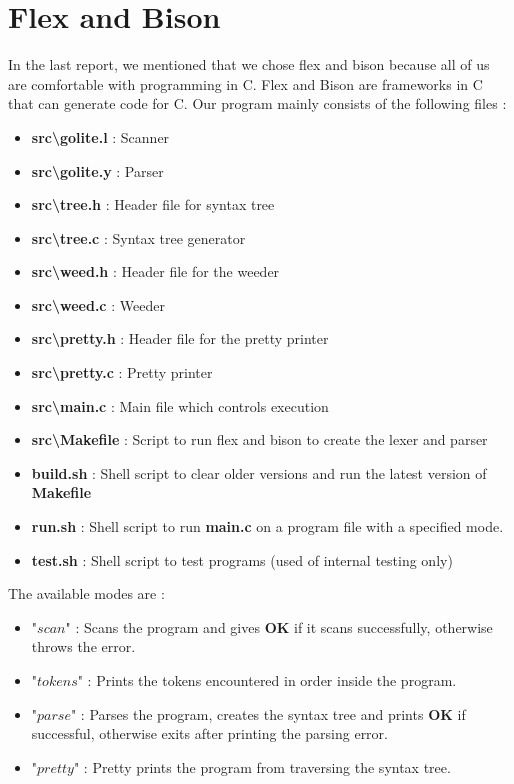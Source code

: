 \documentclass[preprint,12pt]{elsarticle}
\begin{document}
\section{Flex and Bison}

In the last report, we mentioned that we chose flex and bison because all of us are comfortable with programming in C. Flex and Bison are frameworks in C that can generate code for C. Our program mainly consists of the following files : 
\begin{itemize}
\item \textbf{src\textbackslash golite.l} : Scanner
\item \textbf{src\textbackslash golite.y} : Parser
\item \textbf{src\textbackslash tree.h} : Header file for syntax tree
\item \textbf{src\textbackslash tree.c} : Syntax tree generator
\item \textbf{src\textbackslash weed.h} : Header file for the weeder
\item \textbf{src\textbackslash weed.c} : Weeder
\item \textbf{src\textbackslash pretty.h} : Header file for the pretty printer
\item \textbf{src\textbackslash pretty.c} : Pretty printer
\item \textbf{src\textbackslash main.c} : Main file which controls execution
\item \textbf{src\textbackslash Makefile} : Script to run flex and bison to create the lexer and parser
\item \textbf{build.sh} : Shell script to clear older versions and run the latest version of \textbf{Makefile}
\item \textbf{run.sh} : Shell script to run \textbf{main.c} on a program file with a specified mode.
\item \textbf{test.sh} : Shell script to test programs (used of internal testing only)
\end{itemize}

The available modes are : 
\begin{itemize}
\item "$scan$" : Scans the program and gives \textbf{OK} if it scans successfully, otherwise throws the error.
\item "$tokens$" : Prints the tokens encountered in order inside the program.
\item "$parse$" : Parses the program, creates the syntax tree and prints \textbf{OK} if successful, otherwise exits after printing the parsing error.
\item "$pretty$" : Pretty prints the program from traversing the syntax tree.
\end{itemize}
\end{document}
